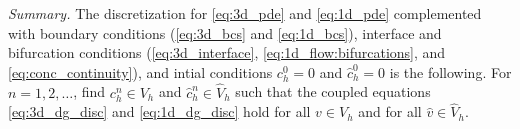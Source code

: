 \documentclass[fleqn,10pt]{wlscirep}
\begin{document}
 \textit{Summary.} The discretization for \eqref{eq:3d_pde} and \eqref{eq:1d_pde} complemented with boundary conditions (\eqref{eq:3d_bcs} and \eqref{eq:1d_bcs}), interface and bifurcation  conditions (\eqref{eq:3d_interface}, \eqref{eq:1d_flow:bifurcations}, and \eqref{eq:conc_continuity}), and intial conditions $c_h^0 =0 $ and $\hat c_h^0 = 0 $ is the following. For $n = 1,2, \ldots $, find  $c_h^n \in V_h$ and $\hat c^n_h \in \hat V_h$ such that the coupled equations \eqref{eq:3d_dg_disc} and \eqref{eq:1d_dg_disc} hold for all $v \in V_h$ and for all $\hat v \in \hat V_h$. 





\end{document}
